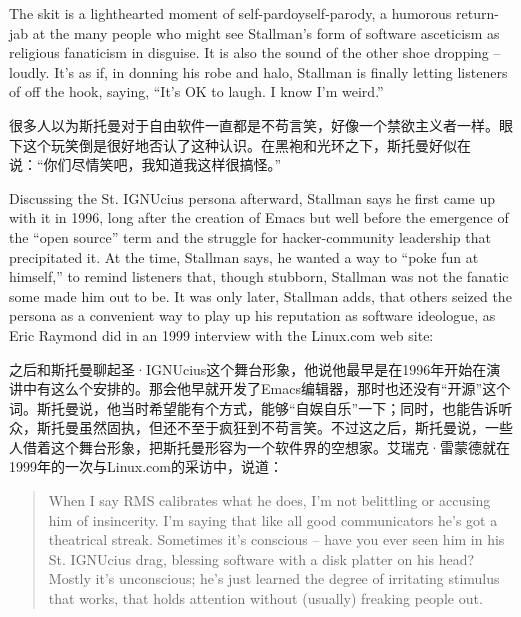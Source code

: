 \ifdefined\eng
The skit is a lighthearted moment of \ifdefined\vone self-pardoy\fi\ifdefined\vtwo self-parody\fi, a humorous return-jab at the many people who might see Stallman's form of software asceticism as religious fanaticism in disguise. It is also the sound of the other shoe dropping -- loudly. It's as if, in donning his robe and halo, Stallman is finally letting listeners \ifdefined\vone of \fi\ifdefined\vtwo off \fi the hook, saying, ``It's OK to laugh. I know I'm weird.''  \ifdefined{}\fi
\fi

\ifdefined\chs
很多人以为斯托曼对于自由软件一直都是不苟言笑，好像一个禁欲主义者一样。眼下这个玩笑倒是很好地否认了这种认识。在黑袍和光环之下，斯托曼好似在说：``你们尽情笑吧，我知道我这样很搞怪。''\ifdefined{}\fi
\fi

\ifdefined\eng
Discussing the St. IGNUcius persona afterward, Stallman says he first came up with it in 1996, long after the creation of Emacs but well before the emergence of the ``open source'' term and the struggle for hacker-community leadership that precipitated it. At the time, Stallman says, he wanted a way to ``poke fun at himself,'' to remind listeners that, though stubborn, Stallman was not the fanatic some made him out to be. It was only later, Stallman adds, that others seized the persona as a convenient way to play up his reputation as software ideologue, as Eric Raymond did in an 1999 interview with the Linux.com web site:
\fi

\ifdefined\chs
之后和斯托曼聊起圣·IGNUcius这个舞台形象，他说他最早是在1996年开始在演讲中有这么个安排的。那会他早就开发了Emacs编辑器，那时也还没有``开源''这个词。斯托曼说，他当时希望能有个方式，能够``自娱自乐''一下；同时，也能告诉听众，斯托曼虽然固执，但还不至于疯狂到不苟言笑。不过这之后，斯托曼说，一些人借着这个舞台形象，把斯托曼形容为一个软件界的空想家。艾瑞克·雷蒙德就在1999年的一次与Linux.com的采访中，说道：
\fi

\ifdefined\eng
\begin{quote}
When I say RMS calibrates what he does, I'm not belittling or accusing him of insincerity. I'm saying that like all good communicators he's got a theatrical streak. Sometimes it's conscious -- have you ever seen him in his St. IGNUcius drag, blessing software with a disk platter on his head? Mostly it's unconscious; he's just learned the degree of irritating stimulus that works, that holds attention without (usually) freaking people out.
\end{quote}
\fi

